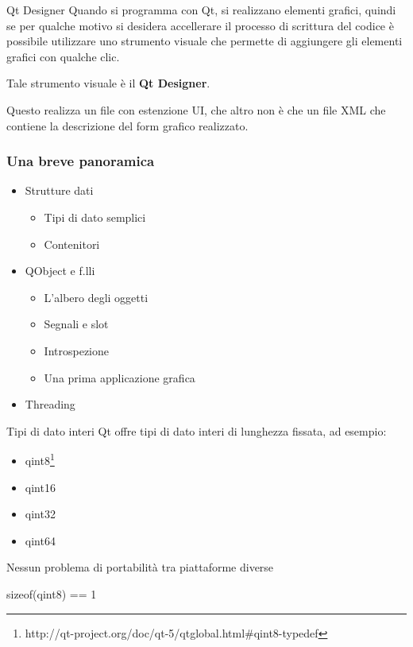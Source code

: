 \documentclass[10pt, aspectratio=169]{beamer}
\begin{document}
\begin{frame}{Qt Designer}
	Quando si programma con Qt, si realizzano elementi grafici, quindi se per qualche motivo si desidera accellerare il processo di scrittura del codice è possibile utilizzare uno strumento visuale che permette di aggiungere gli elementi grafici con qualche clic.
	
	Tale strumento visuale è il \textbf{Qt Designer}.
	
	\bigskip
	
	Questo realizza un file con estenzione {\ttfamily UI}, che altro non è che un file XML che contiene la descrizione del form grafico realizzato.
\end{frame}
\begin{frame}
	\frametitle{Una breve panoramica}
	\begin{block}{}
		\begin{itemize}
			\item Strutture dati
			\begin{itemize}
				\item Tipi di dato semplici
				\item Contenitori
			\end{itemize}
			\item QObject e f.lli
			\begin{itemize}
				\item L'albero degli oggetti
				\item Segnali e slot
				\item Introspezione
				\item Una prima applicazione grafica
			\end{itemize}
			\item Threading
		\end{itemize}
	\end{block}
\end{frame}

\begin{frame}{Tipi di dato interi}
	Qt offre tipi di dato interi di lunghezza fissata, ad esempio:
	\begin{itemize}
		\item qint8\footnote{http://qt-project.org/doc/qt-5/qtglobal.html\#qint8-typedef}
		\item qint16
		\item qint32
		\item qint64
	\end{itemize}
	Nessun problema di portabilità tra piattaforme diverse
	\begin{block}{}
		\centering
		{\ttfamily sizeof(qint8) == 1}
	\end{block}
\end{frame}
\end{document}
